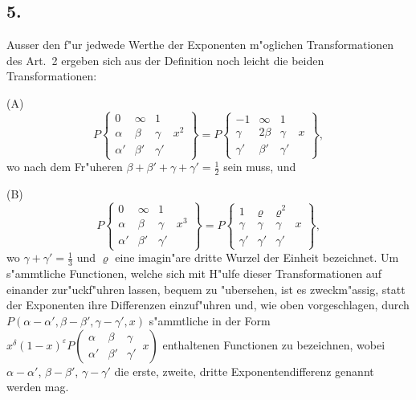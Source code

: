 \documentclass[12pt,a4paper]{article}
\begin{document}
\subsection*{5.}

Ausser den f{"u}r jedwede Werthe der Exponenten m{"o}glichen Transformationen des Art.~2 ergeben sich aus der Definition noch leicht die beiden Transformationen:

\medskip
\noindent (A)
\[
P\left\{\begin{array}{ccc|c}
0 & \infty & 1 \\
\alpha & \beta & \gamma & x^2 \\
\alpha' & \beta' & \gamma'
\end{array}\right\}
= P\left\{\begin{array}{ccc|c}
-1 & \infty & 1 \\
\gamma & 2\beta & \gamma & x \\
\gamma' & \beta' & \gamma'
\end{array}\right\},
\]
wo nach dem Fr{"u}heren $\beta + \beta' + \gamma + \gamma' = \frac{1}{2}$ sein muss, und

\medskip
\noindent (B)
\[
P\left\{\begin{array}{ccc|c}
0 & \infty & 1 \\
\alpha & \beta & \gamma & x^3 \\
\alpha' & \beta' & \gamma'
\end{array}\right\}
= P\left\{\begin{array}{ccc|c}
1 & \varrho & \varrho^2 \\
\gamma & \gamma & \gamma & x \\
\gamma' & \gamma' & \gamma'
\end{array}\right\},
\]
wo $\gamma + \gamma' = \frac{1}{3}$ und $\varrho$ eine imagin{"a}re dritte Wurzel der Einheit bezeichnet. Um s{"a}mmtliche Functionen, welche sich mit H{"u}lfe dieser Transformationen auf einander zur{"u}ckf{"u}hren lassen, bequem zu {"u}bersehen, ist es zweckm{"a}ssig, statt der Exponenten ihre Differenzen einzuf{"u}hren und, wie oben vorgeschlagen, durch $P(\alpha - \alpha', \beta - \beta', \gamma - \gamma', x)$ s{"a}mmtliche in der Form $x^{\delta} (1-x)^{\varepsilon} P\left(\begin{array}{ccc|} \alpha & \beta & \gamma \\ \alpha' & \beta' & \gamma' \end{array}\, x\right)$ enthaltenen Functionen zu bezeichnen, wobei $\alpha - \alpha'$, $\beta - \beta'$, $\gamma - \gamma'$ die erste, zweite, dritte Exponentendifferenz genannt werden mag.
\end{document}
